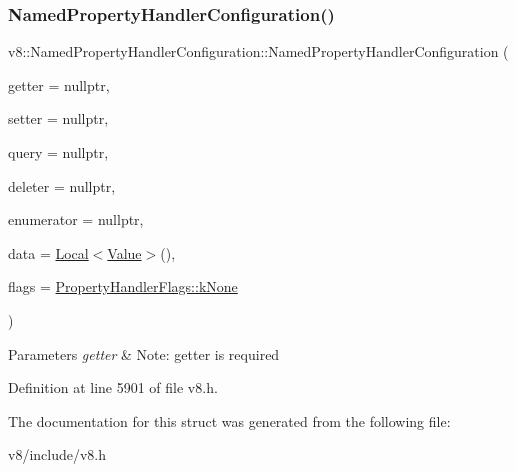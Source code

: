 \subsubsection{\texorpdfstring{Named\+Property\+Handler\+Configuration()}{NamedPropertyHandlerConfiguration()}}
{\footnotesize\ttfamily v8\+::\+Named\+Property\+Handler\+Configuration\+::\+Named\+Property\+Handler\+Configuration (\begin{DoxyParamCaption}\item[{\mbox{\hyperlink{namespacev8_a24b1801fa53a7c5a71366d8044927563}{Generic\+Named\+Property\+Getter\+Callback}}}]{getter = {\ttfamily nullptr},  }\item[{\mbox{\hyperlink{namespacev8_af74716c6e95a269c6cd4314662fd0a7e}{Generic\+Named\+Property\+Setter\+Callback}}}]{setter = {\ttfamily nullptr},  }\item[{\mbox{\hyperlink{namespacev8_add9f7ab11e4a9a2b9ad2c4536b0e1a64}{Generic\+Named\+Property\+Query\+Callback}}}]{query = {\ttfamily nullptr},  }\item[{\mbox{\hyperlink{namespacev8_ad2aecc0406ea4bc02d5a4f84a433b273}{Generic\+Named\+Property\+Deleter\+Callback}}}]{deleter = {\ttfamily nullptr},  }\item[{\mbox{\hyperlink{namespacev8_a20826eb7e52e84fa4f632534e8eddd04}{Generic\+Named\+Property\+Enumerator\+Callback}}}]{enumerator = {\ttfamily nullptr},  }\item[{\mbox{\hyperlink{classv8_1_1Local}{Local}}$<$ \mbox{\hyperlink{classv8_1_1Value}{Value}} $>$}]{data = {\ttfamily \mbox{\hyperlink{classv8_1_1Local}{Local}}$<$\mbox{\hyperlink{classv8_1_1Value}{Value}}$>$()},  }\item[{\mbox{\hyperlink{namespacev8_af4789f0aeb8680e353901a35810cac1a}{Property\+Handler\+Flags}}}]{flags = {\ttfamily \mbox{\hyperlink{namespacev8_af4789f0aeb8680e353901a35810cac1aa35c3ace1970663a16e5c65baa5941b13}{Property\+Handler\+Flags\+::k\+None}}} }\end{DoxyParamCaption})\hspace{0.3cm}{\ttfamily [inline]}}


\begin{DoxyParams}{Parameters}
{\em getter} & Note\+: getter is required \\
\hline
\end{DoxyParams}


Definition at line 5901 of file v8.\+h.



The documentation for this struct was generated from the following file\+:\begin{DoxyCompactItemize}
\item 
v8/include/v8.\+h\end{DoxyCompactItemize}
